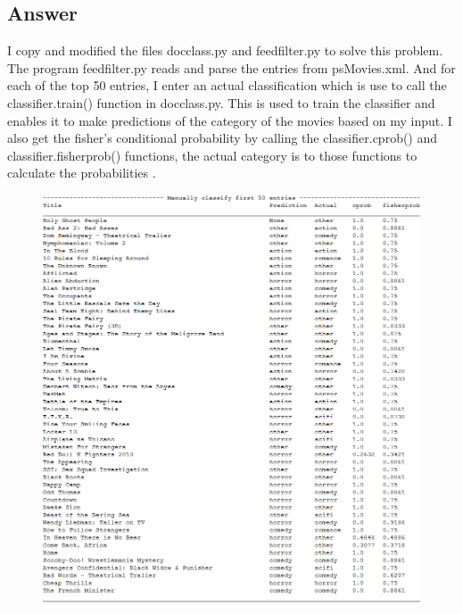 \documentclass[12pt]{article}
\begin{document}
\subsection*{Answer}
I copy and modified the files docclass.py and feedfilter.py to solve this problem. The program feedfilter.py reads and parse the entries from psMovies.xml. And for each of the top 50 entries, I enter an actual classification which is use to call the classifier.train() function in docclass.py. This is used to train the classifier and enables it to make predictions of the category of the movies based on my input. I also get the fisher's conditional probability by calling the classifier.cprob() and classifier.fisherprob() functions, the actual category is to those functions to calculate the probabilities .
\pagebreak

\begin{figure}[h!]
\centering
\includegraphics[width=6.5in]{top50.png}
\end{figure}
\end{document}
